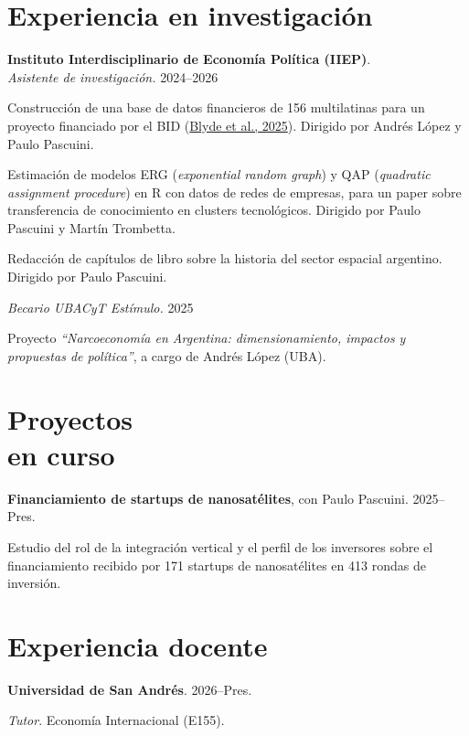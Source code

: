 \documentclass[11pt]{article}
\newcommand{\entrydate}[1]{\hfill{\small{#1}}}
\begin{document}
\section{Experiencia en investigación}
\textbf{Instituto Interdisciplinario de Economía Política (IIEP)}.
\\
\textit{Asistente de investigación.} \entrydate{2024--2026}
\begin{cvitems}
    \item Construcción de una base de datos financieros de 156 multilatinas para un proyecto financiado por el BID (\href{https://publications.iadb.org/es/multilatinas-en-movimiento-caracteristicas-motivaciones-y-lineamientos-de-politica}{Blyde et al., 2025}). Dirigido por Andrés López y Paulo Pascuini.
    \item Estimación de modelos ERG (\textit{exponential random graph}) y QAP (\textit{quadratic assignment procedure}) en R con datos de redes de empresas, para un paper sobre transferencia de conocimiento en clusters tecnológicos. Dirigido por Paulo Pascuini y Martín Trombetta.
    \item Redacción de capítulos de libro sobre la historia del sector espacial argentino. Dirigido por Paulo Pascuini.
\end{cvitems}
\vspace{5pt}
\textit{Becario UBACyT Estímulo.} \entrydate{2025}
\begin{cvitems}
    \item Proyecto \emph{``Narcoeconomía en Argentina: dimensionamiento, impactos y propuestas de política''}, a cargo de Andrés López (UBA).
\end{cvitems}

\section{Proyectos\\en curso}
\textbf{Financiamiento de startups de nanosatélites}, con Paulo Pascuini. \entrydate{2025--Pres.}
\begin{cvitems}
  \item Estudio del rol de la integración vertical y el perfil de los inversores sobre el financiamiento recibido por 171 startups de nanosatélites en 413 rondas de inversión.
\end{cvitems}

\section{Experiencia docente}
\textbf{Universidad de San Andrés}. \entrydate{2026--Pres.}
\begin{cvitems}
  \item \textit{Tutor}. Economía Internacional (E155).
\end{cvitems}
\end{document}
